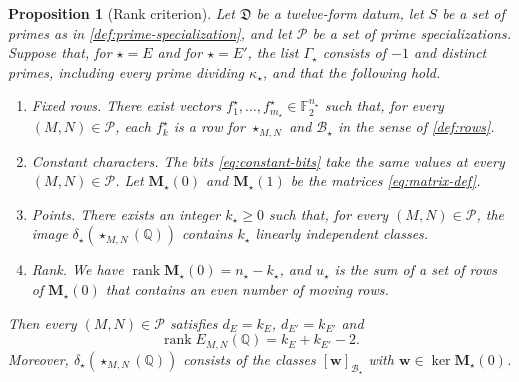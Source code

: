 \documentclass[12pt,oneside,openany]{book}
\theoremstyle{definition}
\theoremstyle{plain}
\numberwithin{equation}{chapter}
\theoremstyle{plain}
\newtheorem{proposition}[proposition]{Proposition}
\theoremstyle{definition}
\theoremstyle{remark}
\newcommand{\Q}{\mathbb Q}
\newcommand{\F}{\mathbb F}
\DeclareMathOperator{\rk}{rank}
\newcommand{\sq}[1]{[#1]}
\newcommand{\datum}{\mathfrak D}
\newcommand{\cB}{\mathcal B}
\newcommand{\cP}{\mathcal P}
\begin{document}
\begin{proposition}[Rank criterion]\label{prop:rank-criterion}
Let $\datum$ be a twelve-form datum, let $S$ be a set of primes as in \cref{def:prime-specialization}, and let $\cP$ be a set of prime specializations. Suppose that, for $\star=E$ and for $\star=E'$, the list $\Gamma_\star$ consists of $-1$ and distinct primes, including every prime dividing $\kappa_\star$, and that the following hold.
\begin{enumerate}[label=(\roman*),ref=(\roman*)]
\item\label{item:crit-fixed} \emph{Fixed rows.} There exist vectors $f^\star_1,\dots,f^\star_{m_\star}\in\F_2^{n_\star}$ such that, for every $(M,N)\in\cP$, each $f^\star_k$ is a row for $\star_{M,N}$ and $\cB_\star$ in the sense of \cref{def:rows}.
\item\label{item:crit-characters} \emph{Constant characters.} The bits \eqref{eq:constant-bits} take the same values at every $(M,N)\in\cP$. Let $\mathbf M_\star(0)$ and $\mathbf M_\star(1)$ be the matrices \eqref{eq:matrix-def}.
\item\label{item:crit-points} \emph{Points.} There exists an integer $k_\star\ge0$ such that, for every $(M,N)\in\cP$, the image $\delta_\star(\star_{M,N}(\Q))$ contains $k_\star$ linearly independent classes.
\item\label{item:crit-rank} \emph{Rank.} We have $\rk\mathbf M_\star(0)=n_\star-k_\star$, and $u_\star$ is the sum of a set of rows of $\mathbf M_\star(0)$ that contains an even number of moving rows.
\end{enumerate}
Then every $(M,N)\in\cP$ satisfies $d_E=k_E$, $d_{E'}=k_{E'}$ and
\begin{equation}\label{eq:rank-criterion}
\rk E_{M,N}(\Q)=k_E+k_{E'}-2.
\end{equation}
Moreover, $\delta_\star(\star_{M,N}(\Q))$ consists of the classes $\sq{\mathbf w}_{\cB_\star}$ with $\mathbf w\in\ker\mathbf M_\star(0)$.
\end{proposition}
\end{document}
